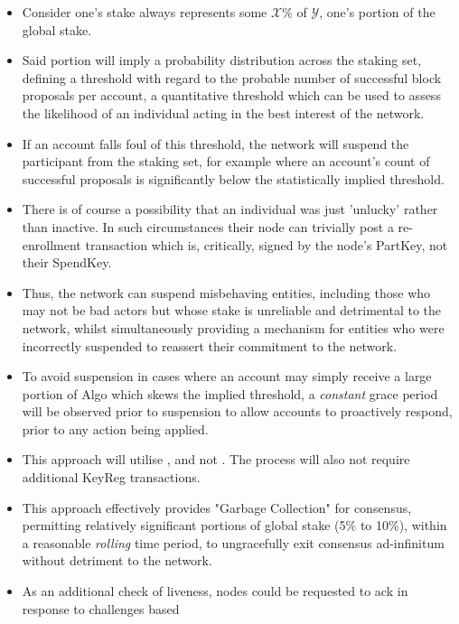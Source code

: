 \documentclass[11pt,a4paper]{article}
\begin{document}
\begin{itemize}
    \item Consider one's stake always represents some $\mathcal{X}\%$ of $\mathcal{Y}$, one's portion of the global 
          stake.
    \item Said portion will imply a probability distribution across the staking set, defining a threshold with regard to 
          the probable number of successful block proposals per account, a quantitative threshold which can be used to 
          assess the likelihood of an individual acting in the best interest of the network.
    \item If an account falls foul of this threshold, the network will suspend the participant from the staking
          set, for example where an account's count of successful proposals is significantly below the statistically 
          implied threshold.
    \item There is of course a possibility that an individual was just 'unlucky' rather than inactive. In such 
          circumstances their node can trivially post a re-enrollment transaction which is, critically, signed by the 
          node's \gls{PartKey}, not their \gls{SpendKey}.
    \item Thus, the network can suspend misbehaving entities, including those who may not be bad actors but whose stake 
          is unreliable and detrimental to the network, whilst simultaneously providing a mechanism for entities who
          were incorrectly suspended to reassert their commitment to the network.
    \item To avoid suspension in cases where an account may simply receive a large portion of Algo which skews the 
          implied threshold, a \emph{constant} grace period will be observed prior to suspension to allow accounts to 
          proactively respond, prior to any action being applied.
    \item This approach will utilise , and not . The process will
          also not require additional \gls{KeyReg} transactions.
    \item This approach effectively provides "Garbage Collection" for consensus, permitting relatively significant 
          portions of global stake (5\% to 10\%), within a reasonable \emph{rolling} time period, to ungracefully exit 
          consensus ad-infinitum without detriment to the network.
    \item As an additional check of liveness, nodes could be requested to ack in response to challenges based 

\end{itemize}
\end{document}
